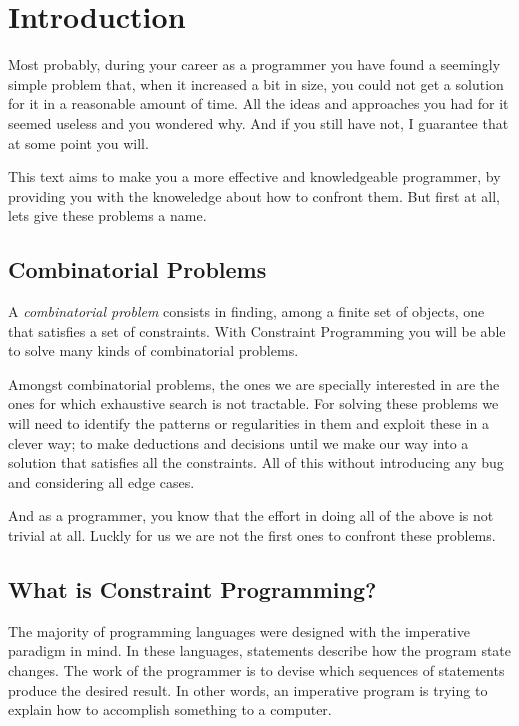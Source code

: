 \section{Introduction}

Most probably, during your career as a programmer you have found
a seemingly simple problem that, when it increased a bit in size, you could not
get a solution for it in a reasonable amount of time. All the ideas and approaches
you had for it seemed useless and you wondered why.
And if you still have not, I guarantee that at some point you will.

This text aims to make you a more effective and knowledgeable programmer, by
providing you with the knoweledge about how to confront them. But first at all,
lets give these problems a name.

\subsection{Combinatorial Problems}

A \emph{combinatorial problem} consists in finding, among a finite set of
objects, one that satisfies a set of constraints. With Constraint Programming
you will be able to solve many kinds of combinatorial problems. 

Amongst combinatorial problems, the ones we are specially interested in are the
ones for which exhaustive search is not tractable. For solving these problems
we will need to identify the patterns or regularities in them and exploit these
in a clever way; to make deductions and decisions until we make our way into a
solution that satisfies all the constraints. All of this without introducing any
bug and considering all edge cases.

And as a programmer, you know that the effort in doing all of the above is not
trivial at all. Luckly for us we are not the first ones to confront these problems.

\subsection{What is Constraint Programming?}

The majority of programming languages were designed with the imperative
paradigm in mind. In these languages, statements describe how the program state
changes.  The work of the programmer is to devise which sequences of statements
produce the desired result. In other words, an imperative program is trying to
explain how to accomplish something to a computer.

